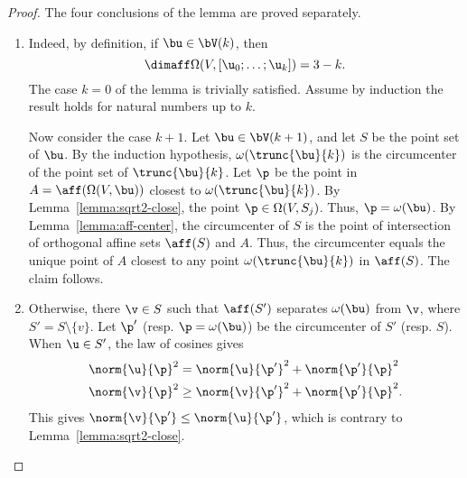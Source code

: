 \begin{proof} The four conclusions of the lemma  are proved
separately.

\begin{enumerate}
\item {} Indeed, by
definition, if $\bu\in \bV(k)$, then
\[  
\dimaff\Omega(V,[\u_0;\ldots;\u_k]) = 3-k.
\]   
The case $k=0$ of the lemma is trivially satisfied.  Assume by
induction the result holds for natural numbers up to $k$.

Now consider the case $k+1$.  Let $\bu\in \bV(k+1)$, and let $S$ be
the point set of $\bu$.  By the induction hypothesis,
$\omega(\trunc{\bu}{k})$ is the circumcenter of the point set of
$\trunc{\bu}{k}$.  Let $\p$ be the point in
$A=\aff(\Omega(V,\bu))$ closest to $\omega(\trunc{\bu}{k})$.  By
Lemma~\ref{lemma:sqrt2-close}, the point $\p\in\Omega(V,S_{j})$.
Thus, $\p=\omega(\bu)$.  By Lemma~\ref{lemma:aff-center}, the
circumcenter of $S$ is the point of intersection of orthogonal affine
sets $\aff(S)$ and $A$.  Thus, the circumcenter equals the unique
point of $A$ closest to any point $\omega(\trunc{\bu}{k})$ in
$\aff(S)$.  The claim follows.



\item{} 
Otherwise, there $\v\in S$ such that $\aff(S')$ separates $\omega(\bu)$ from
$ \v$, where $S'=S\setminus\{v\}$.  Let $\p'$ (resp. $\p=\omega(\bu)$)
be the circumcenter
of $S'$ (resp. $S$).  When $\u\in S'$, the law of cosines gives
\begin{align*} 
\norm{ \u}{\p}^2 &= \norm{\u}{\p'}^2 + \norm{\p'}{\p}^2\\ 
\norm{ \v}{\p}^2 &\ge \norm{\v}{\p'}^2 + \norm{\p'}{\p}^2.
\end{align*}
This gives $\norm{\v}{\p'}\le \norm{\u}{\p'}$, which is contrary to
Lemma~\ref{lemma:sqrt2-close}.


\end{enumerate}
\end{proof}
